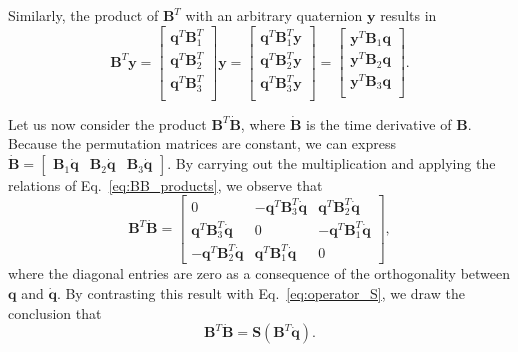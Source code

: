 \documentclass[aip,jcp,reprint,amsmath,amssymb]{revtex4-1}
\newcommand{\mt}[1]{\boldsymbol{\mathbf{#1}}}           %
\newcommand{\vt}[1]{\boldsymbol{\mathbf{#1}}}           %
\newcommand{\tr}[1]{#1^T}                               %
\begin{document}
Similarly, the product of $\tr{\mt B}$ with an arbitrary quaternion $\vt y$ results in
\begin{equation}
\label{eq:vector_entries}
\tr{\mt B}\vt y =
\left[\begin{array}{c}
\tr{\vt q}\tr{\mt B}_1 \\
\tr{\vt q}\tr{\mt B}_2 \\
\tr{\vt q}\tr{\mt B}_3 \\
\end{array}\right]\vt y = 
\left[\begin{array}{c}
\tr{\vt q}\tr{\mt B}_1\vt y \\
\tr{\vt q}\tr{\mt B}_2\vt y \\
\tr{\vt q}\tr{\mt B}_3\vt y \\
\end{array}\right] = 
\left[\begin{array}{c}
\tr{\vt y}{\mt B}_1\vt q \\
\tr{\vt y}{\mt B}_2\vt q \\
\tr{\vt y}{\mt B}_3\vt q \\
\end{array}\right].
\end{equation}

Let us now consider the product $\tr{\mt B}\dot{\mt B}$, where $\dot{\mt B}$ is the time derivative of $\mt B$. Because the permutation matrices are constant, we can express $\dot{\mt B} = [\begin{array}{ccc}{\mt B}_1\dot{\vt q} & {\mt B}_2\dot{\vt q} & {\mt B}_3\dot{\vt q}\end{array}]$. By carrying out the multiplication and applying the relations of Eq.~\ref{eq:BB_products}, we observe that
\[
\tr{\mt B}\dot{\mt B} = \left[
\begin{array}{ccc}
0 & -\tr{\vt q} \tr{\mt B_3}\dot{\vt q} & \tr{\vt q} \tr{\mt B_2}\dot{\vt q} \\
\tr{\vt q} \tr{\mt B_3}\dot{\vt q} & 0 & -\tr{\vt q} \tr{\mt B_1}\dot{\vt q} \\
-\tr{\vt q} \tr{\mt B_2}\dot{\vt q} & \tr{\vt q} \tr{\mt B_1}\dot{\vt q}  & 0
\end{array}
\right],
\]
where the diagonal entries are zero as a consequence of the orthogonality between $\vt q$ and $\dot{\vt q}$. By contrasting this result with Eq.~\ref{eq:operator_S}, we draw the conclusion that
\begin{equation}
\label{eq:relation_B_qdot}
\tr{\mt B}\dot{\mt B} = {\mt S}\left( \tr{\mt B}\dot{\vt q} \right).
\end{equation}
\end{document}
